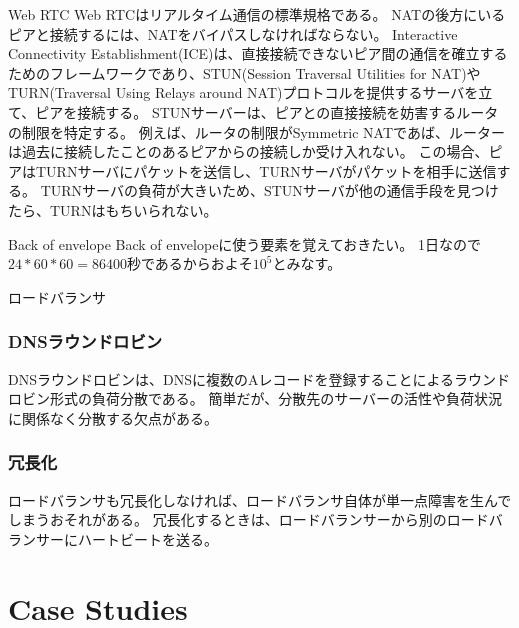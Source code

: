 \documentclass[book]{jlreq}
\begin{document}
\begin{chapter-bib}{Web RTC}
  Web RTCはリアルタイム通信の標準規格である\cite{webrtc}。
  NATの後方にいるピアと接続するには、NATをバイパスしなければならない。
  Interactive Connectivity Establishment(ICE)は、直接接続できないピア間の通信を確立するためのフレームワークであり、STUN(Session Traversal Utilities for NAT)やTURN(Traversal Using Relays around NAT)プロトコルを提供するサーバを立て、ピアを接続する\cite{mdn-webrtc}。
  STUNサーバーは、ピアとの直接接続を妨害するルータの制限を特定する。
  例えば、ルータの制限がSymmetric NATであば、ルーターは過去に接続したことのあるピアからの接続しか受け入れない。
  この場合、ピアはTURNサーバにパケットを送信し、TURNサーバがパケットを相手に送信する。
  TURNサーバの負荷が大きいため、STUNサーバが他の通信手段を見つけたら、TURNはもちいられない。
\end{chapter-bib}
\begin{chapter-bib}{Back of envelope}
  Back of envelopeに使う要素を覚えておきたい。
  1日なので$24*60*60=86400$秒であるからおよそ$10^5$とみなす\cite{sdi2}。
\end{chapter-bib}

\begin{chapter-bib}{ロードバランサ}
  \section{DNSラウンドロビン}
  DNSラウンドロビンは、DNSに複数のAレコードを登録することによるラウンドロビン形式の負荷分散である。
  簡単だが、分散先のサーバーの活性や負荷状況に関係なく分散する欠点がある\cite{cs75}。
  \section{冗長化}
  ロードバランサも冗長化しなければ、ロードバランサ自体が単一点障害を生んでしまうおそれがある。
  冗長化するときは、ロードバランサーから別のロードバランサーにハートビートを送る\cite{cs75}。
\end{chapter-bib}
\part{Case Studies}
\end{document}
